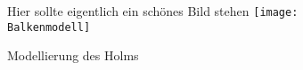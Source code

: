 \begin{figure}
Hier sollte eigentlich ein schönes Bild stehen
	\texttt{[image: Balkenmodell]}
	\caption{Modellierung des Holms}
	\label{fig:Holmmodellierung}
\end{figure}